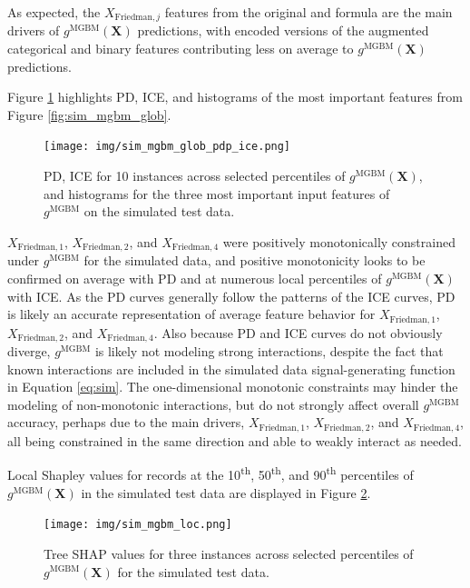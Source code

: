 \documentclass[information,article,submit,moreauthors,pdftex]{definitions/mdpi}
\begin{document}
\noindent As expected, the $X_{\text{Friedman},j}$ features from the original \citet{friedman1979tree} and \citet{friedman1991multivariate} formula are the main drivers of $g^\text{MGBM}(\mathbf{X})$ predictions, with encoded versions of the augmented categorical and binary features contributing less on average to $g^\text{MGBM}(\mathbf{X})$ predictions. 

Figure \ref{fig:sim_mgbm_glob_pdp_ice} highlights PD, ICE, and histograms of the most important features from Figure \ref{fig:sim_mgbm_glob}. 

\begin{figure}[htb]
	\centering
	\texttt{[image: img/sim\_mgbm\_glob\_pdp\_ice.png]}
	\caption{PD, ICE for 10 instances across selected percentiles of $g^\text{MGBM}(\mathbf{X})$, and histograms for the three most important input features of $g^\text{MGBM}$ on the simulated test data.}
	\label{fig:sim_mgbm_glob_pdp_ice}
\end{figure}   

$X_{\text{Friedman},1}$, $X_{\text{Friedman},2}$, and $X_{\text{Friedman},4}$ were positively monotonically constrained under $g^\text{MGBM}$ for the simulated data, and positive monotonicity looks to be confirmed on average with PD and at numerous local percentiles of $g^\text{MGBM}(\mathbf{X})$ with ICE. As the PD curves generally follow the patterns of the ICE curves, PD is likely an accurate representation of average feature behavior for $X_{\text{Friedman},1}$, $X_{\text{Friedman},2}$, and $X_{\text{Friedman},4}$. Also because PD and ICE curves do not obviously diverge, $g^\text{MGBM}$ is likely not modeling strong interactions, despite the fact that known interactions are included in the simulated data signal-generating function in Equation \ref{eq:sim}. The one-dimensional monotonic constraints may hinder the modeling of non-monotonic interactions, but do not strongly affect overall $g^\text{MGBM}$ accuracy, perhaps due to the main drivers, $X_{\text{Friedman},1}$, $X_{\text{Friedman},2}$, and $X_{\text{Friedman},4}$, all being constrained in the same direction and able to weakly interact as needed.

Local Shapley values for records at the 10\textsuperscript{th}, 50\textsuperscript{th}, and 90\textsuperscript{th} percentiles of $g^\text{MGBM}(\mathbf{X})$ in the simulated test data are displayed in Figure \ref{fig:sim_mgbm_loc}. 

\begin{figure}[htb]
	\centering
	\texttt{[image: img/sim\_mgbm\_loc.png]}
	\caption{Tree SHAP values for three instances across selected percentiles of $g^\text{MGBM}(\mathbf{X})$ for the simulated test data.}
	\label{fig:sim_mgbm_loc}
\end{figure}   
\end{document}
